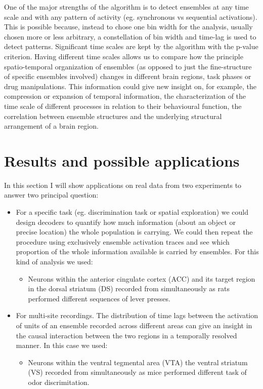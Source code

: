\documentclass{article}
\begin{document}
One of the major strengths of the algorithm is to detect ensembles at any time scale and with any pattern of activity (eg. synchronous vs sequential activations). This is possible because, instead to chose one bin width for the analysis, usually chosen more or less arbitrary, a constellation of bin width and time-lag is used to detect patterns. Significant time scales are kept by the algorithm with the p-value criterion. Having different time scales allows us to compare how the principle spatio-temporal organization of ensembles (as opposed to just the fine-structure of specific ensembles involved) changes in different brain regions, task phases or drug manipulations. This information could give new insight on, for example, the compression or expansion of temporal information, the characterization of the time scale of different processes in relation to their behavioural function, the correlation between ensemble structures and the underlying structural arrangement of a brain region.


\section{Results and possible applications}
In this section I will show applications on real data from two experiments to answer two principal question:
\begin{itemize}
\item For a specific task (eg. discrimination task or spatial exploration) we could design decoders to quantify how much information (about an object or precise location) the whole population is carrying. We could then repeat the procedure using exclusively ensemble activation traces and see which proportion of the whole information available is carried by ensembles. For this kind of analysis we used:
\begin{itemize}
    \item Neurons within the anterior cingulate cortex (ACC) and its target region in the dorsal striatum (DS) recorded from simultaneously as rats performed different sequences of lever presses.
    \end{itemize}
    \item For multi-site recordings. The distribution of time lags between the activation of units of an ensemble recorded across different areas can give an insight in the causal interaction between the two regions in a temporally resolved manner. In this case we used:
    \begin{itemize}
    \item Neurons within the ventral tegmental area (VTA) the ventral striatum (VS) recorded from simultaneously as mice performed different task of odor discrimitation.
    \end{itemize}
\end{itemize}
\end{document}
